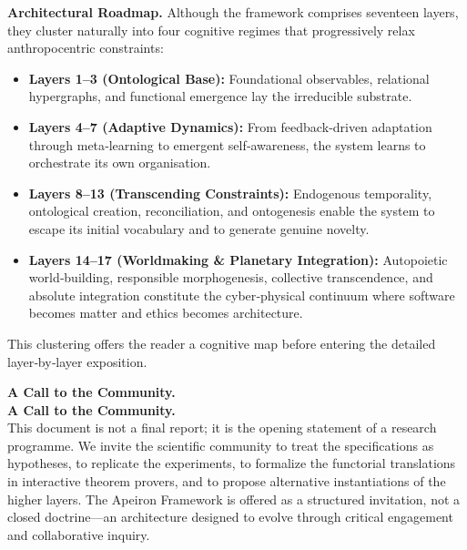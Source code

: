 \bigskip
\noindent\textbf{Architectural Roadmap.}
Although the framework comprises seventeen layers, they cluster naturally into four cognitive regimes that progressively relax anthropocentric constraints:
\begin{itemize}
    \setlength\itemsep{0pt}
    \item \textbf{Layers 1--3 (Ontological Base):} Foundational observables, relational hypergraphs, and functional emergence lay the irreducible substrate.
    \item \textbf{Layers 4--7 (Adaptive Dynamics):} From feedback‑driven adaptation through meta‑learning to emergent self‑awareness, the system learns to orchestrate its own organisation.
    \item \textbf{Layers 8--13 (Transcending Constraints):} Endogenous temporality, ontological creation, reconciliation, and ontogenesis enable the system to escape its initial vocabulary and to generate genuine novelty.
    \item \textbf{Layers 14--17 (Worldmaking \& Planetary Integration):} Autopoietic world‑building, responsible morphogenesis, collective transcendence, and absolute integration constitute the cyber‑physical continuum where software becomes matter and ethics becomes architecture.
\end{itemize}
This clustering offers the reader a cognitive map before entering the detailed layer‑by‑layer exposition.

\bigskip
\noindent\textbf{A Call to the Community.}\\

\bigskip
\noindent\textbf{A Call to the Community.}\\
This document is not a final report; it is the opening statement of a research programme. We invite the scientific community to treat the specifications as hypotheses, to replicate the experiments, to formalize the functorial translations in interactive theorem provers, and to propose alternative instantiations of the higher layers. The Apeiron Framework is offered as a structured invitation, not a closed doctrine---an architecture designed to evolve through critical engagement and collaborative inquiry.